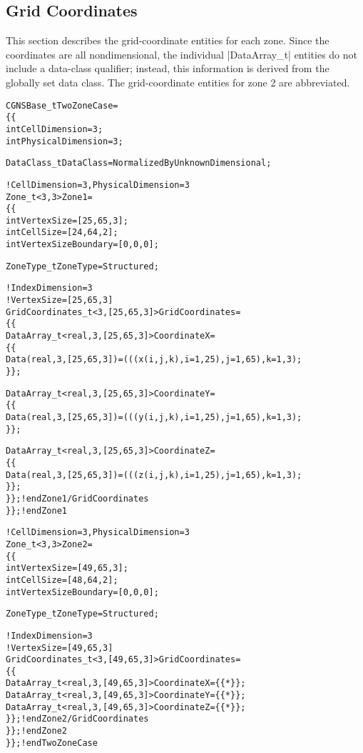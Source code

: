 \subsection{Grid Coordinates}

This section describes the grid-coordinate entities for each
zone.  Since the coordinates are all nondimensional, the individual
|DataArray_t| entities do not include a data-class qualifier; instead,
this information is derived from the globally set data class.  The
grid-coordinate entities for zone 2 are abbreviated.
\begin{alltt}
CGNSBase\_t TwoZoneCase =
  \{\{
  int CellDimension = 3 ;
  int PhysicalDimension = 3 ;

  DataClass\_t DataClass = NormalizedByUnknownDimensional ;

  !  CellDimension = 3, PhysicalDimension = 3
  Zone\_t<3,3> Zone1 =
    \{\{
    int VertexSize = [25,65,3] ;
    int CellSize   = [24,64,2] ;
    int VertexSizeBoundary = [0,0,0];

    ZoneType\_t ZoneType = Structured;

    !  IndexDimension = 3
    !  VertexSize = [25,65,3]
    GridCoordinates\_t<3, [25,65,3]> GridCoordinates =
      \{\{
      DataArray\_t<real, 3, [25,65,3]> CoordinateX =
        \{\{
        Data(real, 3, [25,65,3]) = (((x(i,j,k), i=1,25), j=1,65), k=1,3) ;
        \}\} ;

      DataArray\_t<real, 3, [25,65,3]> CoordinateY =
        \{\{
        Data(real, 3, [25,65,3]) = (((y(i,j,k), i=1,25), j=1,65), k=1,3) ;
        \}\} ;

      DataArray\_t<real, 3, [25,65,3]> CoordinateZ =
        \{\{
        Data(real, 3, [25,65,3]) = (((z(i,j,k), i=1,25), j=1,65), k=1,3) ;
        \}\} ;
      \}\} ;      ! end Zone1/GridCoordinates
    \}\} ;        ! end Zone1

  !  CellDimension = 3, PhysicalDimension = 3
  Zone\_t<3,3> Zone2 =
    \{\{
    int VertexSize = [49,65,3] ;
    int CellSize   = [48,64,2] ;
    int VertexSizeBoundary = [0,0,0];

    ZoneType\_t ZoneType = Structured;

    !  IndexDimension = 3
    !  VertexSize = [49,65,3]
    GridCoordinates\_t<3, [49,65,3]> GridCoordinates =
      \{\{
      DataArray\_t<real, 3, [49,65,3]> CoordinateX = \{\{*\}\} ;
      DataArray\_t<real, 3, [49,65,3]> CoordinateY = \{\{*\}\} ;
      DataArray\_t<real, 3, [49,65,3]> CoordinateZ = \{\{*\}\} ;
      \}\} ;      ! end Zone2/GridCoordinates
    \}\} ;        ! end Zone2
  \}\} ;          ! end TwoZoneCase
\end{alltt}

